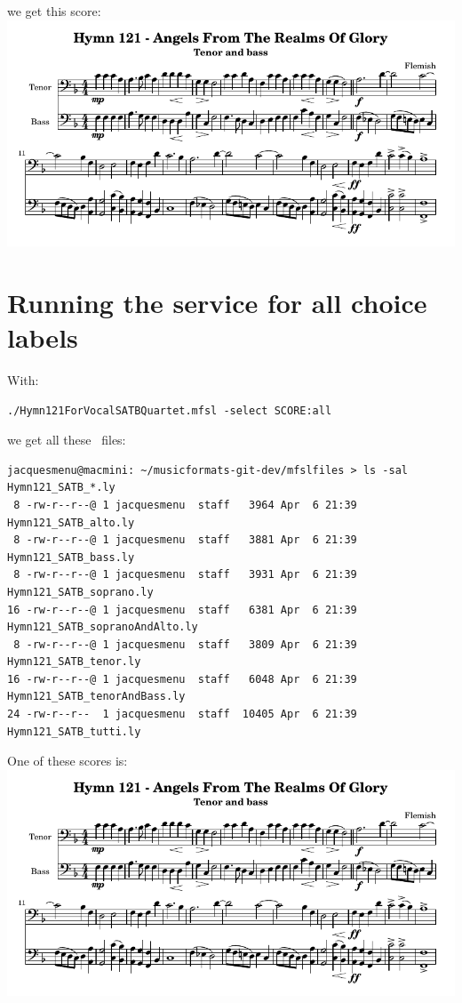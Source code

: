 we get this score:\\
\includegraphics[scale=0.8]{../mfgraphics/Hymn121_SATB_tenorAndBass.png}


\section{Running the service for all choice labels}

With:
\begin{lstlisting}[language=Terminal]
./Hymn121ForVocalSATBQuartet.mfsl -select SCORE:all
\end{lstlisting}

we get all these \lily\ files:
\begin{lstlisting}[language=TerminalSmall]
jacquesmenu@macmini: ~/musicformats-git-dev/mfslfiles > ls -sal Hymn121_SATB_*.ly
 8 -rw-r--r--@ 1 jacquesmenu  staff   3964 Apr  6 21:39 Hymn121_SATB_alto.ly
 8 -rw-r--r--@ 1 jacquesmenu  staff   3881 Apr  6 21:39 Hymn121_SATB_bass.ly
 8 -rw-r--r--@ 1 jacquesmenu  staff   3931 Apr  6 21:39 Hymn121_SATB_soprano.ly
16 -rw-r--r--@ 1 jacquesmenu  staff   6381 Apr  6 21:39 Hymn121_SATB_sopranoAndAlto.ly
 8 -rw-r--r--@ 1 jacquesmenu  staff   3809 Apr  6 21:39 Hymn121_SATB_tenor.ly
16 -rw-r--r--@ 1 jacquesmenu  staff   6048 Apr  6 21:39 Hymn121_SATB_tenorAndBass.ly
24 -rw-r--r--  1 jacquesmenu  staff  10405 Apr  6 21:39 Hymn121_SATB_tutti.ly
\end{lstlisting}

One of these scores is:\\
\includegraphics[scale=0.8]{../mfgraphics/Hymn121_SATB_tenorAndBass.png}


